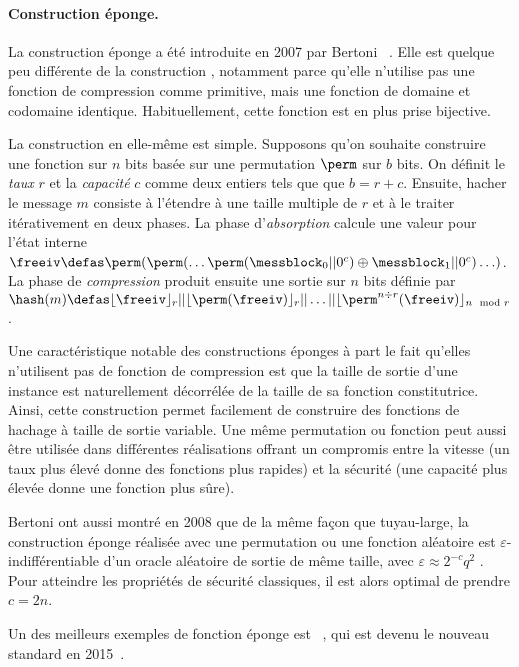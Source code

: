 \paragraph{Construction éponge.} La construction éponge a été introduite en 2007 par
Bertoni \etal~\cite{SpongeFunctions}.
Elle est quelque peu différente de la construction \merkdam, notamment parce qu'elle n'utilise pas une fonction de compression
comme primitive, mais une fonction de domaine et codomaine identique. Habituellement, cette fonction est en plus prise bijective.

La construction en elle-même est simple. Supposons qu'on souhaite construire une fonction sur $n$ bits basée sur une permutation $\perm$ sur $b$ bits.
On définit le \emph{taux} $r$ et la \emph{capacité} $c$ comme deux entiers tels que que $b = r + c$.
Ensuite, hacher le message
$m$ consiste à
l'étendre à une taille multiple de $r$ et à le traiter itérativement en deux phases.
La phase d'\emph{absorption} calcule une valeur pour l'état interne
$\freeiv \defas \perm(\perm(\ldots\perm(\messblock_0||0^c)\oplus\messblock_1||0^c)\ldots)$. La phase de \emph{compression} produit ensuite une sortie sur $n$ bits définie par
$\hash(m) \defas \lfloor\freeiv\rfloor_r||\lfloor\perm(\freeiv)\rfloor_r||\ldots||\lfloor\perm^{n \div r}(\freeiv)\rfloor_{n \mod r}$.

Une caractéristique notable des constructions éponges à part le fait qu'elles n'utilisent pas de fonction de compression est que la taille de sortie d'une instance
est naturellement décorrélée de la taille de sa fonction constitutrice. Ainsi, cette construction permet facilement de construire des fonctions de hachage à
taille de sortie
variable. Une même permutation ou fonction peut aussi être utilisée dans différentes réalisations offrant un compromis entre la vitesse
(un taux plus élevé donne des fonctions plus rapides) et la sécurité (une capacité plus élevée donne une fonction plus sûre).

Bertoni \etal ont aussi montré en 2008 que de la même façon que \merkdam tuyau-large, la construction éponge réalisée avec une permutation ou une fonction aléatoire est
$\varepsilon$-indifférentiable d'un oracle aléatoire de sortie de même taille,
avec $\varepsilon \approx 2^{-c}q^2$ \cite{DBLP:conf/eurocrypt/BertoniDPA08}. Pour atteindre les propriétés de sécurité classiques, il est alors
optimal de prendre $c = 2n$.

Un des meilleurs exemples de fonction éponge est 
\keccak~\cite{KeccakReference}, qui est devenu le nouveau standard \shathree en 2015~\cite{Nist-SHA3}. 

